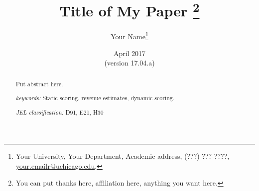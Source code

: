 \documentclass[letterpaper,12pt]{article}
\theoremstyle{definition}
\begin{document}
\begin{titlepage}
\title{Title of My Paper \thanks{You can put thanks here, affiliation here, anything you want here.}
       }
       \author{
  Your Name\footnote{Your University, Your Department, Academic address, (???) ???-????, \href{mailto:your.emailr@uchicago.edu}{your.emailr@uchicago.edu}.}}
\date{April 2017 \\
  \scriptsize{(version 17.04.a)}}
\maketitle
\vspace{-9mm}
\begin{abstract}
\small{Put abstract here.
\vspace{3mm}

\noindent\textit{keywords:}\: Static scoring, revenue estimates, dynamic scoring.

\vspace{3mm}

\noindent\textit{JEL classification:} D91, E21, H30
}

\end{abstract}
\thispagestyle{empty}
\end{titlepage}
\end{document}
